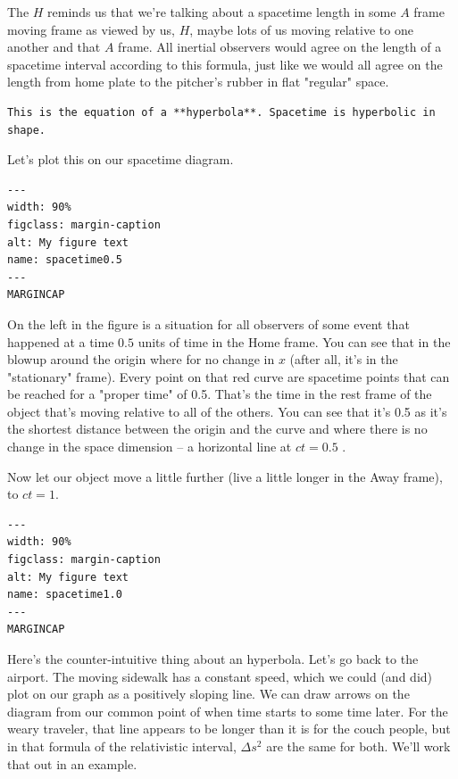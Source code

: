 \documentclass[
]{article}
\begin{document}
The \(H\) reminds us that we're talking about a spacetime length in some
\(A\) frame moving frame as viewed by us, \(H\), maybe lots of us moving
relative to one another and that \(A\) frame. All inertial observers
would agree on the length of a spacetime interval according to this
formula, just like we would all agree on the length from home plate to
the pitcher's rubber in flat "regular" space.

\begin{verbatim}
This is the equation of a **hyperbola**. Spacetime is hyperbolic in shape.
\end{verbatim}

Let's plot this on our spacetime diagram.

\begin{verbatim}
---
width: 90%
figclass: margin-caption
alt: My figure text
name: spacetime0.5
---
MARGINCAP
\end{verbatim}

On the left in the figure is a situation for all observers of some event
that happened at a time \(0.5\) units of time in the Home frame. You can
see that in the blowup around the origin where for no change in \(x\)
(after all, it's in the "stationary" frame). Every point on that red
curve are spacetime points that can be reached for a "proper time" of
0.5. That's the time in the rest frame of the object that's moving
relative to all of the others. You can see that it's 0.5 as it's the
shortest distance between the origin and the curve and where there is no
change in the space dimension -- a horizontal line at \(ct=0.5\) .

Now let our object move a little further (live a little longer in the
Away frame), to \(ct=1\).

\begin{verbatim}
---
width: 90%
figclass: margin-caption
alt: My figure text
name: spacetime1.0
---
MARGINCAP
\end{verbatim}

Here's the counter-intuitive thing about an hyperbola. Let's go back to
the airport. The moving sidewalk has a constant speed, which we could
(and did) plot on our graph as a positively sloping line. We can draw
arrows on the diagram from our common point of when time starts to some
time later. For the weary traveler, that line appears to be longer than
it is for the couch people, but in that formula of the relativistic
interval, \(\Delta s^2\) are the same for both. We'll work that out in
an example.
\end{document}
